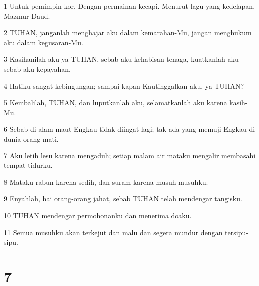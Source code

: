 \par 1 Untuk pemimpin kor. Dengan permainan kecapi. Menurut lagu yang kedelapan. Mazmur Daud.
\par 2 TUHAN, janganlah menghajar aku dalam kemarahan-Mu, jangan menghukum aku dalam kegusaran-Mu.
\par 3 Kasihanilah aku ya TUHAN, sebab aku kehabisan tenaga, kuatkanlah aku sebab aku kepayahan.
\par 4 Hatiku sangat kebingungan; sampai kapan Kautinggalkan aku, ya TUHAN?
\par 5 Kembalilah, TUHAN, dan luputkanlah aku, selamatkanlah aku karena kasih-Mu.
\par 6 Sebab di alam maut Engkau tidak diingat lagi; tak ada yang memuji Engkau di dunia orang mati.
\par 7 Aku letih lesu karena mengaduh; setiap malam air mataku mengalir membasahi tempat tidurku.
\par 8 Mataku rabun karena sedih, dan suram karena musuh-musuhku.
\par 9 Enyahlah, hai orang-orang jahat, sebab TUHAN telah mendengar tangisku.
\par 10 TUHAN mendengar permohonanku dan menerima doaku.
\par 11 Semua musuhku akan terkejut dan malu dan segera mundur dengan tersipu-sipu.

\chapter{7}

